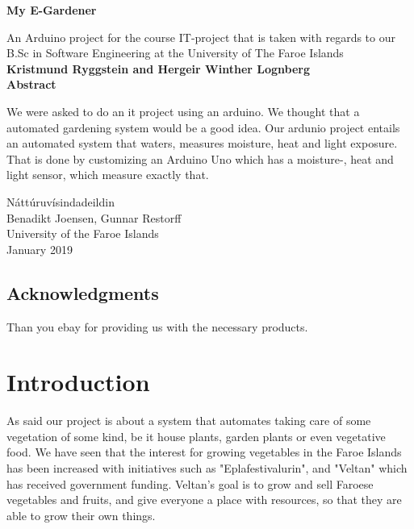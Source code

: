 \documentclass{article}
\begin{document}
\begin{titlepage}
\begin{center}
\vspace{1cm}
\huge
\textbf{My E-Gardener}

\LARGE
\vspace{.5cm}
An Arduino project for the course IT-project that is taken with regards to our B.Sc in Software Engineering at the University of The Faroe Islands \\
\vspace{.5cm}
\textbf{Kristmund Ryggstein and Hergeir Winther Lognberg}\\
\vspace{.5cm}
\Large
\vspace{.5cm}
\Large
\textbf{Abstract}
\end{center}
We were asked to do an it project using an arduino. We thought that a automated gardening system would be a good idea. Our ardunio project entails an automated system that waters, measures moisture, heat and light exposure. That is done by customizing an Arduino Uno which has a moisture-, heat and light sensor, which measure exactly that.

\vfill
\begin{center}
Náttúruvísindadeildin\\
Benadikt Joensen, Gunnar Restorff\\
University of the Faroe Islands\\
January 2019\\
\end{center}
\end{titlepage}
\tableofcontents
\listoffigures
\listoftables
\pagebreak
{}
\begin{center}\section*{Acknowledgments}\end{center}
Than you ebay for providing us with the necessary products.

\pagebreak
{}
\section{Introduction}

As said our project is about a system that automates taking care of some vegetation of some kind, be it house plants, garden plants or even vegetative food. We have seen that the interest for growing vegetables in the Faroe Islands has been increased with initiatives such as "Eplafestivalurin", and "Veltan" which has received government funding. Veltan's goal is to grow and sell Faroese vegetables and fruits, and give everyone a place with resources, so that they are able to grow their own things.
\end{document}
